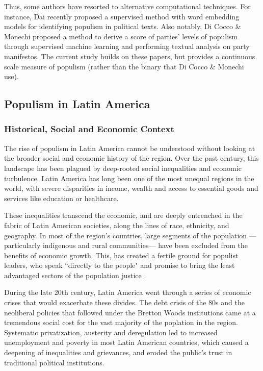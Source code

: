 \documentclass[12pt,letterpaper]{article}
\begin{document}
Thus, some authors have resorted to alternative computational techniques. For instance, Dai \autocite{daiMeasuringPopulismContext} recently proposed a supervised method with word embedding models for identifying populism in political texts. Also notably, Di Cocco \& Monechi \autocite{coccoHowPopulistAre2022} proposed a method to derive a score of parties' levels of populism through supervised machine learning and performing textual analysis on party manifestos. The current study builds on these papers, but provides a continuous scale measure of populism (rather than the binary that Di Cocco \& Monechi\autocite{coccoHowPopulistAre2022} use).

\vspace{.25cm}
\subsection{Populism in Latin America}

\vspace{.25cm}
\subsubsection{Historical, Social and Economic Context}

\vspace{.25cm}
\noindent The rise of populism in Latin America cannot be understood without looking at the broader social and economic history of the region. Over the past century, this landscape has been plagued by deep-rooted social inequalities and economic turbulence. Latin America has long been one of the most unequal regions in the world, with severe disparities in income, wealth and access to essential goods and services like education or healthcare. 

These inequalities transcend the economic, and are deeply entrenched in the fabric of Latin American societies, along the lines of race, ethnicity, and geography. In most of the region's countries, large segments of the population ---particularly indigenous and rural communities--- have been excluded from the benefits of economic growth. This, has created a fertile ground for populist leaders, who speak ``directly to the people" and promise to bring the least advantaged sectors of the population justice \autocite{weylanLatinAmericaAuthoritarian2014} .

During the late 20th century, Latin America went through a series of economic crises that would exacerbate these divides. The debt crisis of the 80s and the neoliberal policies that followed under the Bretton Woods institutions came at a tremendous social cost for the vast majority of the poplation in the region. Systematic privatization, austerity and deregulation led to increased unemployment and poverty in most Latin American countries, which caused a deepening of inequalities and grievances, and eroded the public's trust in traditional political institutions. 
\end{document}
